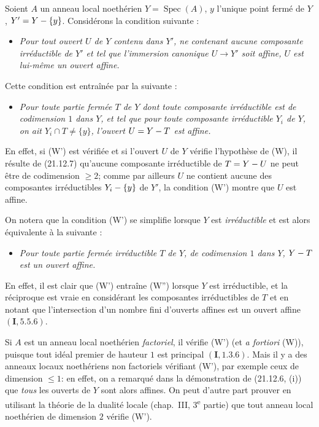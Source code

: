 \begin{env}[21.12.8]
\label{IV.21.12.8}
Soient $A$ un anneau local noethérien $Y=\operatorname{Spec}(A)$, $y$ l'unique point
fermé de $Y$, $Y'=Y-\{y\}$. Considérons la condition suivante :
\begin{itemize}
  \item[\textup{(W)}] \emph{Pour tout ouvert $U$ de $Y$ contenu dans $Y'$, ne
  contenant aucune composante irréductible de $Y'$ et tel que l'immersion canonique
  $U\to Y'$ soit affine, $U$ est lui-même un ouvert affine.}
\end{itemize}

Cette condition est entraînée par la suivante :
\begin{itemize}
  \item[\textup{(W')}] \emph{Pour toute partie fermée $T$ de $Y$ dont toute composante
  irréductible est de codimension $1$ dans $Y$, et tel que pour toute composante
  irréductible $Y_i$ de $Y$, on ait $Y_i\cap T\ne\{y\}$, l'ouvert $U=Y- T$ est affine.}
\end{itemize}

En effet, si (W') est vérifiée et si l'ouvert $U$ de $Y$ vérifie l'hypothèse de (W), il
résulte de (21.12.7) qu'aucune composante irréductible de $T=Y- U$ ne peut être de
codimension $\geq2$; comme par ailleurs $U$ ne contient aucune des composantes
irréductibles $Y_i-\{y\}$ de $Y'$, la condition (W') montre que $U$ est affine.

On notera que la condition (W') se simplifie lorsque $Y$ est \emph{irréductible} et est
alors équivalente à la suivante :
\begin{itemize}
  \item[\textup{(W'')}] \emph{Pour toute partie fermée irréductible $T$ de $Y$, de
  codimension $1$ dans $Y$, $Y- T$ est un ouvert affine.}
\end{itemize}

En effet, il est clair que (W') entraîne (W'') lorsque $Y$ est irréductible, et la
réciproque est vraie en considérant les composantes irréductibles de $T$ et en notant
que l'intersection d'un nombre fini d'ouverts affines est un ouvert affine
$(\mathbf I, 5.5.6)$.
\end{env}

\begin{examples}[21.12.9]
\label{IV.21.12.9}
Si $A$ est un anneau local noethérien \emph{factoriel}, il vérifie (W') (et
\emph{a fortiori} (W)), puisque tout idéal premier de hauteur $1$ est principal
$(\mathbf I, 1.3.6)$. Mais il y a des anneaux locaux noethériens non factoriels
vérifiant (W'), par exemple ceux de dimension $\leq1$: en effet, on a remarqué dans la
démonstration de (21.12.6, (i)) que \emph{tous} les ouverts de $Y$ sont alors affines.
On peut d'autre part prouver en utilisant la théorie de la dualité locale (chap.~III,
3\textsuperscript{e} partie) que tout anneau local noethérien de dimension $2$ vérifie
(W').
\end{examples}

